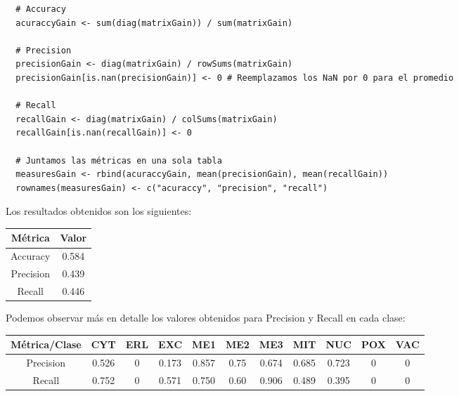\documentclass[11pt]{article}
\begin{document}
\begin{verbatim}
  # Accuracy 
  acuraccyGain <- sum(diag(matrixGain)) / sum(matrixGain)

  # Precision
  precisionGain <- diag(matrixGain) / rowSums(matrixGain)
  precisionGain[is.nan(precisionGain)] <- 0 # Reemplazamos los NaN por 0 para el promedio
  
  # Recall
  recallGain <- diag(matrixGain) / colSums(matrixGain)
  recallGain[is.nan(recallGain)] <- 0

  # Juntamos las métricas en una sola tabla
  measuresGain <- rbind(acuraccyGain, mean(precisionGain), mean(recallGain))
  rownames(measuresGain) <- c("acuraccy", "precision", "recall")
\end{verbatim}

Los resultados obtenidos son los siguientes:

\begin{table}[h!]
  \begin{center}
    \begin{tabular}{|c|c|}
      \hline
      Métrica     & Valor     \\ \hline
      Accuracy    & 0.584     \\ \hline
      Precision   & 0.439     \\ \hline
      Recall      & 0.446     \\ \hline
    \end{tabular}
  \end{center}
\end{table}

Podemos observar más en detalle los valores obtenidos para Precision y Recall en cada clase:

\begin{table}[h!]
  \begin{center}
    \begin{tabular}{|c|c|c|c|c|c|c|c|c|c|c|}
      \hline
      Métrica/Clase  & CYT    & ERL & EXC   & ME1    & ME2  & ME3   & MIT   & NUC   & POX & VAC \\ \hline
      Precision      & 0.526  & 0   & 0.173 & 0.857  & 0.75 & 0.674 & 0.685 & 0.723 &  0  & 0   \\ \hline
      Recall         & 0.752  & 0   & 0.571 & 0.750  & 0.60 & 0.906 & 0.489 & 0.395 &  0  & 0   \\ \hline
    \end{tabular}
  \end{center}
\end{table}
\end{document}
